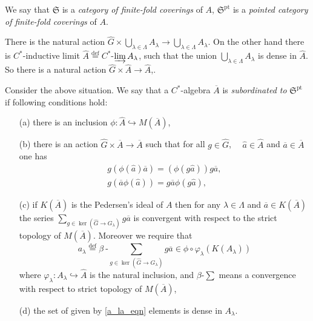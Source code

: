 \documentclass{beamer}
\theoremstyle{plain}
\newcommand{\be}{\begin{equation}}
\newcommand{\ee}{\end{equation}}
\newcommand{\la}{\lambda}
\newcommand{\La}{\Lambda}
\newcommand{\bt}{\beta}           %
\newcommand{\bydef}{\stackrel{\mathrm{def}}{=}}
\newcommand{\hookto}{\hookrightarrow}        %
\begin{document}
\begin{frame}
	\begin{definition}
		We say that $\mathfrak{S}$ is a \textit{category of finite-fold coverings} of $A$, $\mathfrak{S}^{\text{pt}}$ is a \textit{pointed category of finite-fold coverings} of $A$.
	\end{definition}
	
There is the natural action $\widehat{G}\times \bigcup_{\la\in \La} A_\la \to  \bigcup_{\la\in \La} A_\la$. On the other hand there is $C^*$-inductive limit $\widehat A \bydef C^*$-$\varinjlim A_\la$, such that the union $\bigcup_{\la\in \La} A_\la$ is dense in $\widehat A$. So there is a natural action $\widehat{G} \times \widehat{A}\to \widehat{A}$,.
\end{frame}
\begin{frame}
	Consider the above situation.  We say that a $C^*$-algebra $\overline A$ is \textit{ subordinated to}  $\mathfrak{S}^{\text{pt}}$ if following conditions hold:
	\begin{enumerate}
		\item [(a)] there is an inclusion $\phi: \widehat A \hookto M\left(\overline A\right)$,
		\item[(b)] there is an action $\widehat{G}\times \overline A \to \overline A$ such that
		for all $g \in \widehat{G}$,  $\quad \widehat a \in \widehat{A}$ and $\overline a \in \overline{A}$ one has
		\be\label{subord_ga_eqn}
		\begin{split}
			g\left(\phi\left(\widehat a \right)\overline{a}\right)  = 	\left(\phi\left(g\widehat a \right)\right) g \overline{a},\\
			g\left( \overline{a}\phi\left(\widehat a \right)\right) =g \overline{a}\phi\left(g\widehat a \right),
		\end{split}
		\ee
		\item[(c)] if $K\left( \overline{A}\right)$ is the Pedersen's ideal of $A$ then   for any $\la\in \La$  and $\overline a \in K\left( \overline{A}\right)$ the series $\sum_{g \in \ker\left(\widehat{G}\to G_\la\right)}g \overline a$ is convergent with respect to the strict topology of $M\left(\overline{A} \right)$. Moreover we require that
		\be\label{a_la_eqn}
		a_\la \bydef 	\bt~\text{-}\sum_{g \in \ker\left(\widehat{G}\to G_\la\right)}g \overline a \in \phi\circ \varphi_\la\left( K\left( A_\la\right) \right) 	
		\ee
		where $\varphi_\la : A_\la \hookto \widehat A$ is the natural inclusion, and $\bt$-$\sum$ means a convergence with respect to strict topology of $M\left( \overline A\right)$,
		\item[(d)] the set of given by \eqref{a_la_eqn} elements is dense in $A_\la$.
	\end{enumerate}

\end{frame}
\end{document}
